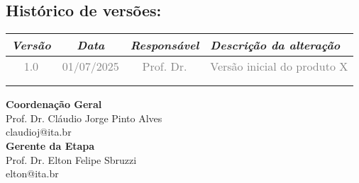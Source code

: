 \begin{pretextualblock}
	
	

\chapter*{Histórico de versões:}

	\begin{table}[H]
		\centering
		\begin{tabularx}{\textwidth}{|c|c|c|X|}
			\hline
			\textcolor{airdataBlue}{\textit{Versão}} &
			\textcolor{airdataBlue}{\textit{Data}} &
			\textcolor{airdataBlue}{\textit{Responsável}} &
			\textcolor{airdataBlue}{\textit{Descrição da alteração}} \\
			\hline
			\textcolor{gray}{1.0} & \textcolor{gray}{01/07/2025} & \textcolor{gray}{Prof. Dr.} & \textcolor{gray}{Versão inicial do produto X} \\
			\hline
			& & & \\
			\hline
			& & & \\
			\hline
		\end{tabularx}
	\end{table}


\newpage
\pagestyle{empty} 


\vspace*{2cm}    %
\begin{flushright}
	\textbf{Coordenação Geral}\\
	Prof. Dr. Cláudio Jorge Pinto Alves\\
	claudioj@ita.br\\
	\vspace*{10cm}
	\textbf{Gerente da Etapa}\\
	Prof. Dr. Elton Felipe Sbruzzi\\
	elton@ita.br
\end{flushright}

\newpage
\pagestyle{empty} 



\end{pretextualblock}
